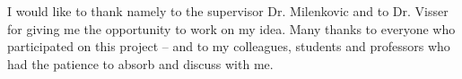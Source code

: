 \begin{dissacknowledgments}
\vspace{-0.4in} 
I would like to thank namely to the supervisor Dr. Milenkovic and to Dr. Visser for giving me the opportunity to work on my idea. Many thanks to everyone who participated on this project -- and to my colleagues, students and professors who had the patience to absorb and discuss with me.
\vspace{-0.3in}
\end{dissacknowledgments}
